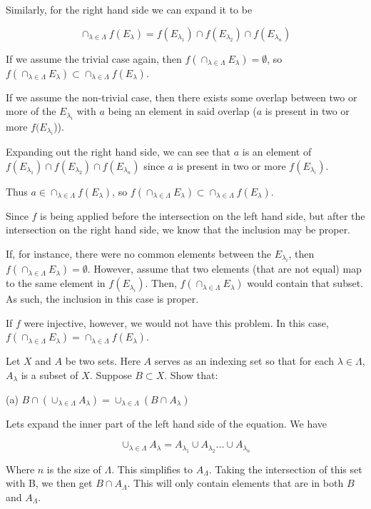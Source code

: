 \documentclass[addpoints]{exam}
\begin{document}
\begin{questions}
Similarly, for the right hand side we can expand it to be

\[\cap_{\lambda \in \Lambda}f(E_\lambda) = f(E_{\lambda_1}) \cap f(E_{\lambda_2}) \cap f(E_{\lambda_n})\]

If we assume the trivial case again, then $f(\cap_{\lambda \in \Lambda}E_{\lambda}) = \emptyset$, so $f(\cap_{\lambda \in \Lambda}E_{\lambda}) \subset \cap_{\lambda \in \Lambda}f(E_\lambda)$.

If we assume the non-trivial case, then there exists some overlap between two or more of the $E_{\lambda_i}$ with $a$ being an element in said overlap ($a$ is present in two or more $f(E_{\lambda_i}$)). 

Expanding out the right hand side, we can see that $a$ is an element of $f(E_{\lambda_1}) \cap f(E_{\lambda_2}) \cap f(E_{\lambda_n})$ since $a$ is present in two or more $f(E_{\lambda_i})$. 

Thus $a \in \cap_{\lambda \in \Lambda}f(E_\lambda)$, so $f(\cap_{\lambda \in \Lambda}E_{\lambda}) \subset \cap_{\lambda \in \Lambda}f(E_\lambda)$.

Since $f$ is being applied before the intersection on the left hand side, but after the intersection on the right hand side, we know that the inclusion may be proper.

If, for instance, there were no common elements between the $E_{\lambda_i}$, then $f(\cap_{\lambda \in \Lambda}E_{\lambda}) = \emptyset$. However, assume that two elements (that are not equal) map
to the same element in $f(E_{\lambda_i})$. Then, $f(\cap_{\lambda \in \Lambda}E_{\lambda})$ would contain that subset. As such, the inclusion in this case is proper. 

If $f$ were injective, however, we would not have this problem. In this case, $f(\cap_{\lambda \in \Lambda}E_{\lambda}) = \cap_{\lambda \in \Lambda}f(E_\lambda)$.

\question Let $X$ and $A$ be two sets. Here $A$ serves as an indexing set so that for each $\lambda \in \Lambda$, $A_\lambda$ is a subset of $X$. 
Suppose $B \subset X$. Show that:

(a) $B \cap (\cup_{\lambda \in \Lambda}A_{\lambda}) = \cup_{\lambda \in \Lambda}(B \cap A_{\lambda})$

Lets expand the inner part of the left hand side of the equation. We have

\[\cup_{\lambda \in \Lambda}A_{\lambda} = A_{\lambda_1} \cup A_{\lambda_2} ... \cup A_{\lambda_n}\]

Where $n$ is the size of $\Lambda$. This simplifies to $A_\Lambda$. Taking the intersection of this set with B, we then get
$B \cap A_\Lambda$. This will only contain elements that are in both $B$ and $A_\Lambda$.


\end{questions}
\end{document}
